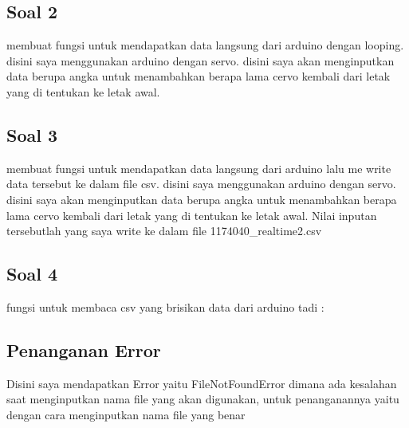 	

	\subsection{Soal 2}
	membuat fungsi untuk mendapatkan data langsung dari arduino dengan looping. disini saya menggunakan arduino dengan servo. disini saya akan menginputkan data berupa angka untuk menambahkan berapa lama cervo kembali dari letak yang di tentukan ke letak awal.

	

	\subsection{Soal 3}
	membuat fungsi untuk mendapatkan data langsung dari arduino lalu me write data tersebut ke dalam file csv. disini saya menggunakan arduino dengan servo. disini saya akan menginputkan data berupa angka untuk menambahkan berapa lama cervo kembali dari letak yang di tentukan ke letak awal. Nilai inputan tersebutlah yang saya  write ke dalam file 1174040\_realtime2.csv

	

	\subsection{Soal 4}
	
	fungsi untuk membaca csv yang brisikan data dari arduino tadi :

	

	\subsection{Penanganan Error}
	Disini saya mendapatkan Error yaitu FileNotFoundError dimana ada kesalahan saat menginputkan nama file yang akan digunakan, untuk penanganannya yaitu dengan cara menginputkan nama file yang benar 

	
	
